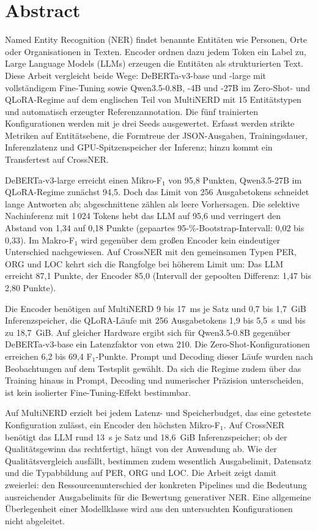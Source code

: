 \chapter*{Abstract}
\thispagestyle{plain}

Named Entity Recognition (NER) findet benannte Entitäten wie Personen,
Orte oder Organisationen in Texten.
Encoder ordnen dazu jedem Token ein Label zu, Large Language Models
(LLMs) erzeugen die Entitäten als strukturierten Text.
Diese Arbeit vergleicht beide Wege: DeBERTa-v3-base und -large mit
vollständigem Fine-Tuning sowie Qwen3.5-0.8B, -4B und -27B im Zero-Shot-
und QLoRA-Regime auf dem englischen Teil von MultiNERD mit
15 Entitätstypen und automatisch erzeugter Referenzannotation.
Die fünf trainierten Konfigurationen werden mit je drei Seeds
ausgewertet.
Erfasst werden strikte Metriken auf Entitätsebene, die Formtreue der
JSON-Ausgaben, Trainingsdauer, Inferenzlatenz und GPU-Spitzenspeicher
der Inferenz; hinzu kommt ein Transfertest auf CrossNER.

DeBERTa-v3-large erreicht einen Mikro-F$_1$ von 95,8 Punkten,
Qwen3.5-27B im QLoRA-Regime zunächst 94,5.
Doch das Limit von 256 Ausgabetokens schneidet lange Antworten ab;
abgeschnittene zählen als leere Vorhersagen.
Die selektive Nachinferenz mit 1\,024 Tokens hebt das LLM auf 95,6 und
verringert den Abstand von 1,34 auf 0,18 Punkte (gepaartes
95-\%-Bootstrap-Intervall: 0,02 bis 0,33).
Im Makro-F$_1$ wird gegenüber dem großen Encoder kein eindeutiger
Unterschied nachgewiesen.
Auf CrossNER mit den gemeinsamen Typen PER, ORG und LOC kehrt sich die
Rangfolge bei höherem Limit um: Das LLM erreicht 87,1 Punkte, der Encoder
85,0 (Intervall der gepoolten Differenz: 1,47 bis 2,80 Punkte).

Die Encoder benötigen auf MultiNERD 9 bis 17~ms je Satz und 0,7 bis
1,7~GiB Inferenzspeicher, die QLoRA-Läufe mit 256 Ausgabetokens 1,9 bis
5,5~s und bis zu 18,7~GiB.
Auf gleicher Hardware ergibt sich für Qwen3.5-0.8B gegenüber
DeBERTa-v3-base ein Latenzfaktor von etwa 210.
Die Zero-Shot-Konfigurationen erreichen 6,2 bis 69,4 F$_1$-Punkte.
Prompt und Decoding dieser Läufe wurden nach Beobachtungen auf dem
Testsplit gewählt.
Da sich die Regime zudem über das Training hinaus in Prompt, Decoding und
numerischer Präzision unterscheiden, ist kein isolierter
Fine-Tuning-Effekt bestimmbar.

Auf MultiNERD erzielt bei jedem Latenz- und Speicherbudget, das eine
getestete Konfiguration zulässt, ein Encoder den höchsten Mikro-F$_1$.
Auf CrossNER benötigt das LLM rund 13~s je Satz und 18,6~GiB
Inferenzspeicher; ob der Qualitätsgewinn das rechtfertigt, hängt von der
Anwendung ab.
Wie der Qualitätsvergleich ausfällt, bestimmen zudem wesentlich
Ausgabelimit, Datensatz und die Typabbildung auf PER, ORG und LOC.
Die Arbeit zeigt damit zweierlei: den Ressourcenunterschied der konkreten
Pipelines und die Bedeutung ausreichender Ausgabelimits für die Bewertung
generativer NER.
Eine allgemeine Überlegenheit einer Modellklasse wird aus den
untersuchten Konfigurationen nicht abgeleitet.
